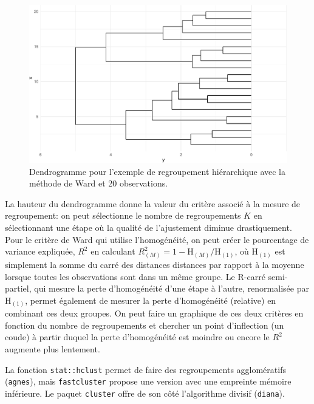\documentclass[
  11pt,
  letterpaper,
]{book}
\theoremstyle{definition}
\theoremstyle{remark}
\begin{document}
\begin{figure}[ht!]

{\centering \includegraphics[width=1\textwidth,height=\textheight]{./03-regroupements_files/figure-pdf/fig-dendrogramme-1.pdf}

}

\caption{\label{fig-dendrogramme}Dendrogramme pour l'exemple de
regroupement hiérarchique avec la méthode de Ward et 20 observations.}

\end{figure}

La hauteur du dendrogramme donne la valeur du critère associé à la
mesure de regroupement: on peut sélectionne le nombre de regroupements
\(K\) en sélectionnant une étape où la qualité de l'ajustement diminue
drastiquement. Pour le critère de Ward qui utilise l'homogénéité, on
peut créer le pourcentage de variance expliquée, \(R^2\) en calculant
\(R^2_{(M)} = 1-\mathrm{H}_{(M)}/\mathrm{H}_{(1)}\), où
\(\mathrm{H}_{(1)}\) est simplement la somme du carré des distances
distances par rapport à la moyenne lorsque toutes les observations sont
dans un même groupe. Le R-carré semi-partiel, qui mesure la perte
d'homogénéité d'une étape à l'autre, renormalisée par
\(\mathrm{H}_{(1)}\), permet également de mesurer la perte d'homogénéité
(relative) en combinant ces deux groupes. On peut faire un graphique de
ces deux critères en fonction du nombre de regroupements et chercher un
point d'inflection (un coude) à partir duquel la perte d'homogénéité est
moindre ou encore le \(R^2\) augmente plus lentement.

La fonction \texttt{stat::hclust} permet de faire des regroupements
agglomératifs (\texttt{agnes}), mais \texttt{fastcluster} propose une
version avec une empreinte mémoire inférieure. Le paquet
\texttt{cluster} offre de son côté l'algorithme divisif
(\texttt{diana}).
\end{document}

